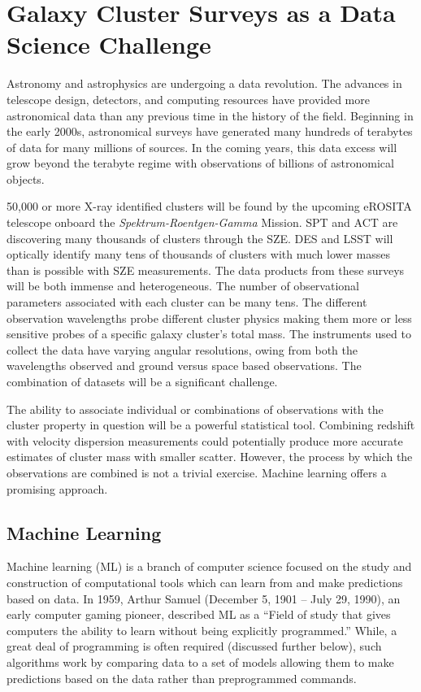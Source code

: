 \section{Galaxy Cluster Surveys as a Data Science Challenge}
Astronomy and astrophysics are undergoing a data revolution. The advances in telescope design, detectors, and computing resources have provided more astronomical data than any previous time in the history of the field. Beginning in the early 2000s, astronomical surveys have generated many hundreds of terabytes of data for many millions of sources. In the coming years, this data excess will grow beyond the terabyte regime with observations of billions of astronomical objects. 

50,000 or more X-ray identified clusters will be found by the upcoming eROSITA telescope onboard the \emph{Spektrum-Roentgen-Gamma} Mission. SPT and ACT are discovering many thousands of clusters through the SZE. DES and LSST will optically identify  many tens of thousands of clusters with much lower masses than is possible with SZE measurements. The data products from these surveys will be both immense and heterogeneous. The number of observational parameters associated with each cluster can be many tens. The different observation wavelengths probe different cluster physics making them more or less sensitive probes of a specific galaxy cluster's total mass. The instruments used to collect the data have varying angular resolutions, owing from both the wavelengths observed and ground versus space based observations. The combination of datasets will be a significant challenge.

The ability to associate individual or combinations of observations with the cluster property in question will be a powerful statistical tool. Combining redshift with velocity dispersion measurements could potentially produce more accurate estimates of cluster mass with smaller scatter. However, the process by which the observations are combined is not a trivial exercise. Machine learning offers a promising approach.

\subsection{Machine Learning}
Machine learning (ML) is a branch of computer science focused on the study and construction of computational tools which can learn from and make predictions based on data. In 1959, Arthur Samuel (December 5, 1901 -- July 29, 1990), an early computer gaming pioneer, described ML as a ``Field of study that gives computers the ability to learn without being explicitly programmed.'' While, a great deal of programming is often required (discussed further below), such algorithms work by comparing data to a set of models allowing them to make predictions based on the data rather than preprogrammed commands.

